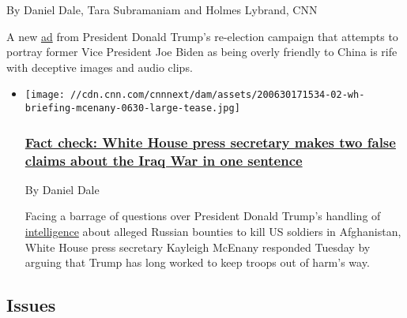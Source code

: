 By Daniel Dale, Tara Subramaniam and Holmes Lybrand, CNN

A new \href{https://www.youtube.com/watch?v=Nv7yVCwv6NU}{ad} from
President Donald Trump's re-election campaign that attempts to portray
former Vice President Joe Biden as being overly friendly to China is
rife with deceptive images and audio clips.

\begin{itemize}
\item
  \href{/2020/07/01/politics/fact-check-mcenany-trump-iraq/index.html}{}

  \texttt{[image: //cdn.cnn.com/cnnnext/dam/assets/200630171534-02-wh-briefing-mcenany-0630-large-tease.jpg]}

  \hypertarget{fact-check-white-house-press-secretary-makes-two-false-claims-about-the-iraq-war-in-one-sentence}{%
  \subsubsection{\texorpdfstring{\href{/2020/07/01/politics/fact-check-mcenany-trump-iraq/index.html}{Fact
  check: White House press secretary makes two false claims about the
  Iraq War in one
  sentence}}{Fact check: White House press secretary makes two false claims about the Iraq War in one sentence}}\label{fact-check-white-house-press-secretary-makes-two-false-claims-about-the-iraq-war-in-one-sentence}}

  By Daniel Dale

  Facing a barrage of questions over President Donald Trump's handling
  of
  \href{https://www.cnn.com/2020/06/30/politics/white-house-russia-afghanistan-bounties-intelligence-2019/index.html}{intelligence}
  about alleged Russian bounties to kill US soldiers in Afghanistan,
  White House press secretary Kayleigh McEnany responded Tuesday by
  arguing that Trump has long worked to keep troops out of harm's way.
\end{itemize}

\hypertarget{issues-}{%
\subsection{Issues~}\label{issues-}}

